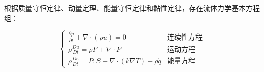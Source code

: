 

根据质量守恒定律、动量定理、能量守恒定律和黏性定律，存在流体力学基本方程组：

\begin{equation}
    \begin{cases}
        \frac{\partial\rho}{\partial t} + \nabla \cdot (\rho u) = 0 &\text{连续性方程}  \\
        \rho \frac{Du}{Dt} = \rho F + \nabla \cdot P &\text{运动方程}    \\
        \rho \frac{De}{Dt} = P:S + \nabla \cdot (k\nabla T) + \rho \dot{q}  &\text{能量方程}
    \end{cases}
\end{equation}



